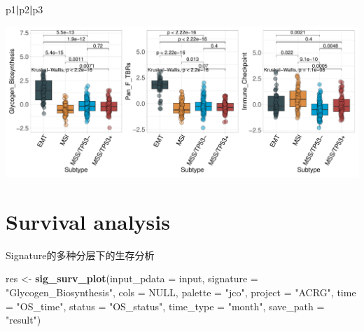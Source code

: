 \documentclass[
  12pt,
]{book}
\newenvironment{Shaded}{\begin{snugshade}}{\end{snugshade}}
\newcommand{\AttributeTok}[1]{\textcolor[rgb]{0.13,0.29,0.53}{#1}}
\newcommand{\ConstantTok}[1]{\textcolor[rgb]{0.56,0.35,0.01}{#1}}
\newcommand{\FunctionTok}[1]{\textcolor[rgb]{0.13,0.29,0.53}{\textbf{#1}}}
\newcommand{\NormalTok}[1]{#1}
\newcommand{\OtherTok}[1]{\textcolor[rgb]{0.56,0.35,0.01}{#1}}
\newcommand{\SpecialCharTok}[1]{\textcolor[rgb]{0.81,0.36,0.00}{\textbf{#1}}}
\newcommand{\StringTok}[1]{\textcolor[rgb]{0.31,0.60,0.02}{#1}}
\theoremstyle{definition}
\theoremstyle{definition}
\theoremstyle{definition}
\theoremstyle{definition}
\theoremstyle{remark}
\begin{document}
\begin{Shaded}
\begin{Highlighting}[]
\NormalTok{p1}\SpecialCharTok{|}\NormalTok{p2}\SpecialCharTok{|}\NormalTok{p3}
\end{Highlighting}
\end{Shaded}

\begin{center}\includegraphics{_main_files/figure-latex/unnamed-chunk-35-1} \end{center}

\hypertarget{survival-analysis}{%
\section{Survival analysis}\label{survival-analysis}}

Signature的多种分层下的生存分析

\begin{Shaded}
\begin{Highlighting}[]
\NormalTok{res }\OtherTok{\textless{}{-}}       \FunctionTok{sig\_surv\_plot}\NormalTok{(}\AttributeTok{input\_pdata       =}\NormalTok{ input, }
                           \AttributeTok{signature         =} \StringTok{"Glycogen\_Biosynthesis"}\NormalTok{,}
                           \AttributeTok{cols              =} \ConstantTok{NULL}\NormalTok{, }
                           \AttributeTok{palette           =} \StringTok{"jco"}\NormalTok{,}
                           \AttributeTok{project           =} \StringTok{"ACRG"}\NormalTok{,}
                           \AttributeTok{time              =} \StringTok{"OS\_time"}\NormalTok{,}
                           \AttributeTok{status            =} \StringTok{"OS\_status"}\NormalTok{,}
                           \AttributeTok{time\_type         =} \StringTok{"month"}\NormalTok{,}
                           \AttributeTok{save\_path         =} \StringTok{"result"}\NormalTok{)}
\end{Highlighting}
\end{Shaded}
\end{document}
